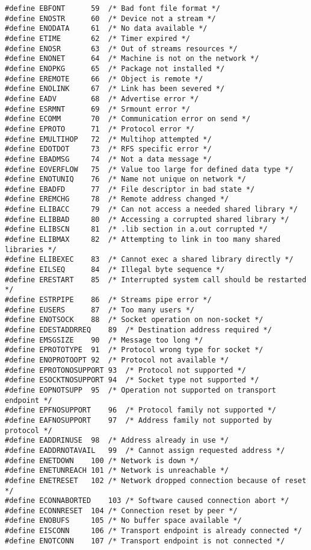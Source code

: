 \begin{verbatim}
#define	EBFONT		59	/* Bad font file format */
#define	ENOSTR		60	/* Device not a stream */
#define	ENODATA		61	/* No data available */
#define	ETIME		62	/* Timer expired */
#define	ENOSR		63	/* Out of streams resources */
#define	ENONET		64	/* Machine is not on the network */
#define	ENOPKG		65	/* Package not installed */
#define	EREMOTE		66	/* Object is remote */
#define	ENOLINK		67	/* Link has been severed */
#define	EADV		68	/* Advertise error */
#define	ESRMNT		69	/* Srmount error */
#define	ECOMM		70	/* Communication error on send */
#define	EPROTO		71	/* Protocol error */
#define	EMULTIHOP	72	/* Multihop attempted */
#define	EDOTDOT		73	/* RFS specific error */
#define	EBADMSG		74	/* Not a data message */
#define	EOVERFLOW	75	/* Value too large for defined data type */
#define	ENOTUNIQ	76	/* Name not unique on network */
#define	EBADFD		77	/* File descriptor in bad state */
#define	EREMCHG		78	/* Remote address changed */
#define	ELIBACC		79	/* Can not access a needed shared library */
#define	ELIBBAD		80	/* Accessing a corrupted shared library */
#define	ELIBSCN		81	/* .lib section in a.out corrupted */
#define	ELIBMAX		82	/* Attempting to link in too many shared libraries */
#define	ELIBEXEC	83	/* Cannot exec a shared library directly */
#define	EILSEQ		84	/* Illegal byte sequence */
#define	ERESTART	85	/* Interrupted system call should be restarted */
#define	ESTRPIPE	86	/* Streams pipe error */
#define	EUSERS		87	/* Too many users */
#define	ENOTSOCK	88	/* Socket operation on non-socket */
#define	EDESTADDRREQ	89	/* Destination address required */
#define	EMSGSIZE	90	/* Message too long */
#define	EPROTOTYPE	91	/* Protocol wrong type for socket */
#define	ENOPROTOOPT	92	/* Protocol not available */
#define	EPROTONOSUPPORT	93	/* Protocol not supported */
#define	ESOCKTNOSUPPORT	94	/* Socket type not supported */
#define	EOPNOTSUPP	95	/* Operation not supported on transport endpoint */
#define	EPFNOSUPPORT	96	/* Protocol family not supported */
#define	EAFNOSUPPORT	97	/* Address family not supported by protocol */
#define	EADDRINUSE	98	/* Address already in use */
#define	EADDRNOTAVAIL	99	/* Cannot assign requested address */
#define	ENETDOWN	100	/* Network is down */
#define	ENETUNREACH	101	/* Network is unreachable */
#define	ENETRESET	102	/* Network dropped connection because of reset */
#define	ECONNABORTED	103	/* Software caused connection abort */
#define	ECONNRESET	104	/* Connection reset by peer */
#define	ENOBUFS		105	/* No buffer space available */
#define	EISCONN		106	/* Transport endpoint is already connected */
#define	ENOTCONN	107	/* Transport endpoint is not connected */

\end{verbatim}
